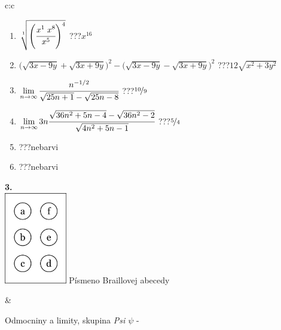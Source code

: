 \documentclass[10pt]{report}
\begin{document}
\begin{tabular}{c:c}
\begin{minipage}[c][104.5mm][t]{0.5\linewidth}
\begin{center}
\begin{minipage}{0.79\linewidth}
\begin{center}
\begin{varwidth}{\linewidth}
\begin{enumerate}
\small
\item $\sqrt[1]{\left(\cfrac{x^{1}\;x^{8}}{x^{5}}\right)^{4}}$\quad \dotfill\; ???\;\dotfill \quad $x^{16}$
\item {\footnotesize{\scriptsize$\big(\sqrt{3x-9y}+\sqrt{3x+9y}\big)^2-\big(\sqrt{3x-9y}-\sqrt{3x+9y}\big)^2$}\quad \dotfill\; ???\;\dotfill \quad $12\sqrt{x^2+3y^2}$}
\item $\lim\limits_{n\to\infty}\cfrac{n^{-1/2}}{\sqrt{25n+1}-\sqrt{25n-8}}$\quad \dotfill\; ???\;\dotfill \quad $\nicefrac{10}{9}$
\item $\lim\limits_{n\to\infty}3n\cfrac{\sqrt{36n^2+5n-4}-\sqrt{36n^2-2}}{\sqrt{4n^2+5n-1}}$\quad \dotfill\; ???\;\dotfill \quad $\nicefrac{5}{4}$
\item \quad \dotfill\; ???\;\dotfill \quad nebarvi
\item \quad \dotfill\; ???\;\dotfill \quad nebarvi
\end{enumerate}
\end{varwidth}
\end{center}
\end{minipage}
\begin{minipage}{0.20\linewidth}
\begin{center}
{\Huge\bfseries 3.} \\[2mm]
\includegraphics[height=40mm]{../images/braille.png}
{\small Písmeno Braillovej abecedy}
\end{center}
\end{minipage}
\end{center}
\end{minipage}
&
\begin{minipage}[c][104.5mm][t]{0.5\linewidth}
\begin{center}
\vspace{7mm}
{\huge Odmocniny a limity, skupina \textit{Psi $\psi$} -}\\[5mm]

\end{center}
\end{minipage}
\end{tabular}
\end{document}
